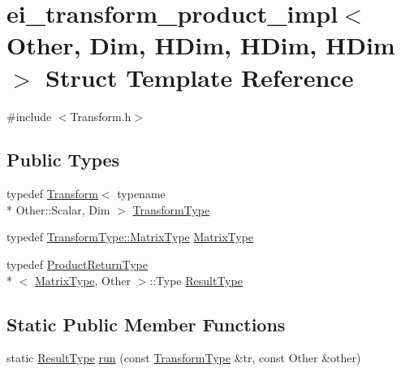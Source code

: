 \hypertarget{structei__transform__product__impl_3_01_other_00_01_dim_00_01_h_dim_00_01_h_dim_00_01_h_dim_01_4}{\section{ei\-\_\-transform\-\_\-product\-\_\-impl$<$ Other, Dim, H\-Dim, H\-Dim, H\-Dim $>$ Struct Template Reference}
\label{structei__transform__product__impl_3_01_other_00_01_dim_00_01_h_dim_00_01_h_dim_00_01_h_dim_01_4}
}


{\ttfamily \#include $<$Transform.\-h$>$}

\subsection*{Public Types}
\begin{DoxyCompactItemize}
\item 
typedef \hyperlink{class_transform}{Transform}$<$ typename \\*
Other\-::\-Scalar, Dim $>$ \hyperlink{structei__transform__product__impl_3_01_other_00_01_dim_00_01_h_dim_00_01_h_dim_00_01_h_dim_01_4_adb47397f5b3cbf5a9270407d83eb9ce8}{Transform\-Type}
\item 
typedef \hyperlink{class_transform_afcdb9f1ab6b63ddfbc52789ef6319f33}{Transform\-Type\-::\-Matrix\-Type} \hyperlink{structei__transform__product__impl_3_01_other_00_01_dim_00_01_h_dim_00_01_h_dim_00_01_h_dim_01_4_a1cf099be5f79f67173f84cde8196fe2c}{Matrix\-Type}
\item 
typedef \hyperlink{struct_product_return_type}{Product\-Return\-Type}\\*
$<$ \hyperlink{structei__transform__product__impl_3_01_other_00_01_dim_00_01_h_dim_00_01_h_dim_00_01_h_dim_01_4_a1cf099be5f79f67173f84cde8196fe2c}{Matrix\-Type}, Other $>$\-::Type \hyperlink{structei__transform__product__impl_3_01_other_00_01_dim_00_01_h_dim_00_01_h_dim_00_01_h_dim_01_4_a28fef3d5380ae5a3b93ad83eef1e0f61}{Result\-Type}
\end{DoxyCompactItemize}
\subsection*{Static Public Member Functions}
\begin{DoxyCompactItemize}
\item 
static \hyperlink{structei__transform__product__impl_3_01_other_00_01_dim_00_01_h_dim_00_01_h_dim_00_01_h_dim_01_4_a28fef3d5380ae5a3b93ad83eef1e0f61}{Result\-Type} \hyperlink{structei__transform__product__impl_3_01_other_00_01_dim_00_01_h_dim_00_01_h_dim_00_01_h_dim_01_4_ac42a24863e373f31d9a74705000ba528}{run} (const \hyperlink{structei__transform__product__impl_3_01_other_00_01_dim_00_01_h_dim_00_01_h_dim_00_01_h_dim_01_4_adb47397f5b3cbf5a9270407d83eb9ce8}{Transform\-Type} \&tr, const Other \&other)
\end{DoxyCompactItemize}


